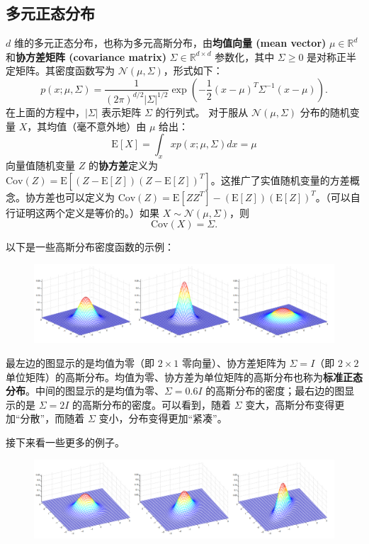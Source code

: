 \subsection{多元正态分布}

$d$ 维的多元正态分布，也称为多元高斯分布，由\textbf{均值向量 (mean vector)} $\mu \in \mathbb{R}^d$ 和\textbf{协方差矩阵 (covariance matrix)} $\Sigma \in \mathbb{R}^{d \times d}$ 参数化，其中 $\Sigma \ge 0$ 是对称正半定矩阵。其密度函数写为 $\mathcal{N}(\mu, \Sigma)$，形式如下：
\[
    p(x; \mu, \Sigma) = \frac{1}{(2\pi)^{d/2}|\Sigma|^{1/2}} \exp\left(-\frac{1}{2}(x-\mu)^T \Sigma^{-1}(x-\mu)\right).
\]
在上面的方程中，$|\Sigma|$ 表示矩阵 $\Sigma$ 的行列式。
对于服从 $\mathcal{N}(\mu, \Sigma)$ 分布的随机变量 $X$，其均值（毫不意外地）由 $\mu$ 给出：
\[
    \mathrm{E}[X] = \int_x x p(x; \mu, \Sigma) dx = \mu
\]
向量值随机变量 $Z$ 的\textbf{协方差}定义为 $\text{Cov}(Z) = \mathrm{E}[(Z - \mathrm{E}[Z])(Z - \mathrm{E}[Z])^T]$。这推广了实值随机变量的方差概念。协方差也可以定义为 $\text{Cov}(Z) = \mathrm{E}[ZZ^T] - (\mathrm{E}[Z])(\mathrm{E}[Z])^T$。（可以自行证明这两个定义是等价的。）如果 $X \sim \mathcal{N}(\mu, \Sigma)$，则
\[
    \mathrm{Cov}(X) = \Sigma.
\]

以下是一些高斯分布密度函数的示例：

\begin{figure}[H]
    \centering
    \includegraphics[width=1.0\linewidth]{figs/gaussian_density1.png}
\end{figure}

最左边的图显示的是均值为零（即 $2 \times 1$ 零向量）、协方差矩阵为 $\Sigma = I$（即 $2 \times 2$ 单位矩阵）的高斯分布。均值为零、协方差为单位矩阵的高斯分布也称为\textbf{标准正态分布}。中间的图显示的是均值为零、$\Sigma = 0.6I$ 的高斯分布的密度；最右边的图显示的是 $\Sigma = 2I$ 的高斯分布的密度。可以看到，随着 $\Sigma$ 变大，高斯分布变得更加“分散”，而随着 $\Sigma$ 变小，分布变得更加“紧凑”。

接下来看一些更多的例子。

\begin{figure}[H]
    \centering
    \includegraphics[width=1.0\linewidth]{figs/gaussian_density2.png}
\end{figure}

